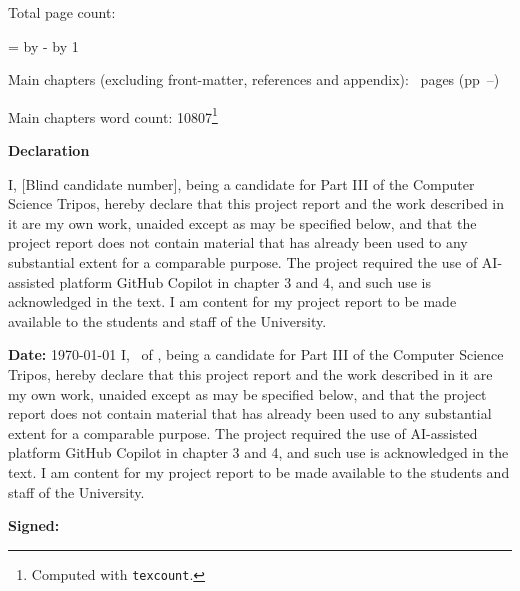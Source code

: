 \begin{sffamily}
\begin{titlepage}
        \makeatother
    \end{titlepage}

    \newpage

    Total page count: \pageref{lastpage}

    \makeatletter
    \@tempcnta=\relax%
    \advance\@tempcnta by -%
    \advance\@tempcnta by 1%
    \xdef\contentpages{\the\@tempcnta}%
    \makeatother

    Main chapters (excluding front-matter, references and appendix):
    \contentpages~pages
    (pp~\pageref{firstcontentpage}--\pageref{lastcontentpage})

    Main chapters word count: 10807\footnote{Computed with \texttt{texcount}.}

\end{sffamily}

\vspace{\fill}
\onehalfspacing
\makeatletter
\textbf{\Huge Declaration}
\vspace{40pt}

\ifsubmission
    I, [Blind candidate number], being a candidate for Part III of the Computer Science Tripos, hereby declare that this project report and the work described in it are my own work, unaided except as may be specified below, and that the project report does not contain material that has already been used to any substantial extent for a comparable purpose. The project required the use of AI-assisted platform GitHub Copilot in chapter 3 and 4, and such use is acknowledged in the text. I am content for my project report to be made available to the students and staff of the University.

    \bigskip
    \textbf{Date:} \today
\else
    I, \@author\ of \college, being a candidate for Part III of the Computer Science Tripos, hereby declare that this project report and the work described in it are my own work, unaided except as may be specified below, and that the project report does not contain material that has already been used to any substantial extent for a comparable purpose. The project required the use of AI-assisted platform GitHub Copilot in chapter 3 and 4, and such use is acknowledged in the text. I am content for my project report to be made available to the students and staff of the University.

    \bigskip
    \textbf{Signed:} \@author

